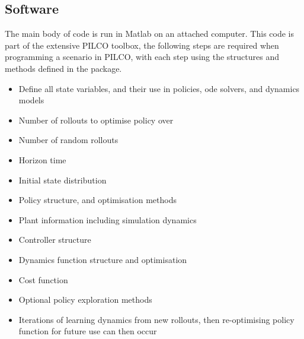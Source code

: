 \documentclass[twoside,twocolumn,12pt]{article}
\begin{document}
\subsection{Software}
The main body of code is run in Matlab on an attached computer. This code is part of the extensive PILCO toolbox, the following steps are required when programming a scenario in PILCO, with each step using the structures and methods defined in the package.

\begin{itemize}
\item Define all state variables, and their use in policies, ode solvers, and dynamics models
\item Number of rollouts to optimise policy over 
\item Number of random rollouts
\item Horizon time
\item Initial state distribution
\item Policy structure, and optimisation methods
\item Plant information including simulation dynamics
\item Controller structure
\item Dynamics function structure and optimisation
\item Cost function
\item Optional policy exploration methods
\item Iterations of learning dynamics from new rollouts, then re-optimising policy function for future use can then occur
\end{itemize}
\end{document}
